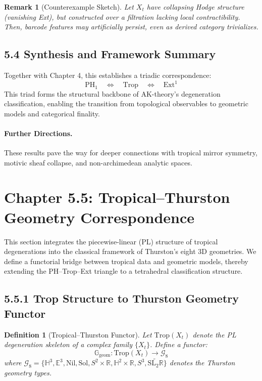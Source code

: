 \documentclass[11pt]{article}
\newtheorem{definition}[theorem]{Definition}
\newtheorem{remark}[theorem]{Remark}
\begin{document}
\begin{remark}[Counterexample Sketch]
Let $X_t$ have collapsing Hodge structure (vanishing Ext), but constructed over a filtration lacking local contractibility. Then, barcode features may artificially persist, even as derived category trivializes.
\end{remark}

\subsection{5.4 Synthesis and Framework Summary}

Together with Chapter 4, this establishes a triadic correspondence:
\[
\mathrm{PH}_1 \quad \Longleftrightarrow \quad \mathrm{Trop} \quad \Longleftrightarrow \quad \mathrm{Ext}^1
\]
This triad forms the structural backbone of AK-theory’s degeneration classification, enabling the transition from topological observables to geometric models and categorical finality.

\paragraph{Further Directions.}
These results pave the way for deeper connections with tropical mirror symmetry, motivic sheaf collapse, and non-archimedean analytic spaces.

\section{Chapter 5.5: Tropical–Thurston Geometry Correspondence}
\label{sec:thurston}

This section integrates the piecewise-linear (PL) structure of tropical degenerations into the classical framework of Thurston’s eight 3D geometries. We define a functorial bridge between tropical data and geometric models, thereby extending the PH–Trop–Ext triangle to a tetrahedral classification structure.

\subsection{5.5.1 Trop Structure to Thurston Geometry Functor}

\begin{definition}[Tropical–Thurston Functor]
Let \( \mathrm{Trop}(X_t) \) denote the PL degeneration skeleton of a complex family \( \{X_t\} \). Define a functor:
\[
\mathbb{G}_\mathrm{geom} : \mathrm{Trop}(X_t) \longrightarrow \mathcal{G}_8
\]
where \( \mathcal{G}_8 = \{ \mathbb{H}^3, \mathbb{E}^3, \text{Nil}, \text{Sol}, S^2 \times \mathbb{R}, \mathbb{H}^2 \times \mathbb{R}, S^3, \widetilde{\text{SL}_2\mathbb{R}} \} \) denotes the Thurston geometry types.
\end{definition}
\end{document}
